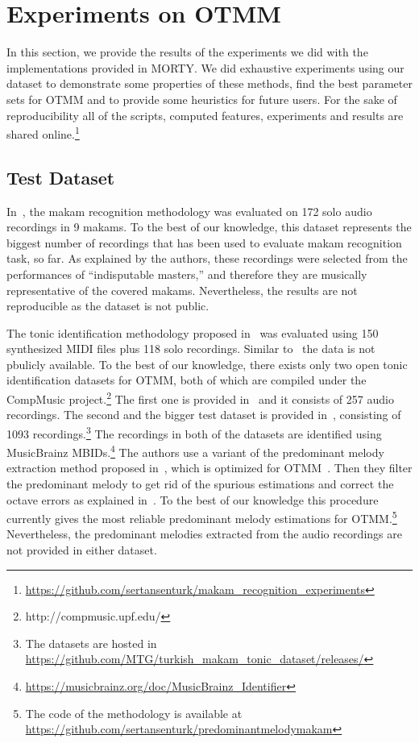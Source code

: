 \documentclass{sig-alternate}
\begin{document}
\section{Experiments on OTMM}\label{sec:experiments}
In this section, we provide the results of the experiments we did with the implementations provided in MORTY. We did exhaustive experiments using our dataset to demonstrate some properties of these methods, find the best parameter sets for OTMM and to provide some heuristics for future users. For the sake of reproducibility all of the scripts, computed features, experiments and results are shared online.\footnote{\url{https://github.com/sertansenturk/makam_recognition_experiments}}

\subsection{Test Dataset}\label{sec:dataset}

In~\cite{bozkurt_makam}, the makam recognition methodology was evaluated on 172 solo audio recordings in 9 makams. To the best of our knowledge, this dataset represents the biggest number of recordings that has been used to evaluate makam recognition task, so far. As explained by the authors, these recordings were selected from the performances of ``indisputable masters,'' and therefore they are musically representative of the covered makams. Nevertheless, the results are not reproducible as the dataset is not public. 

The tonic identification methodology proposed in~\cite{bozkurt_tonic} was evaluated using 150 synthesized MIDI files plus 118 solo recordings. Similar to~\cite{bozkurt_makam} the data is not pbulicly available. To the best of our knowledge, there exists only two open tonic identification datasets for OTMM, both of which are compiled under the CompMusic project.\footnote{http://compmusic.upf.edu/} The first one is provided in~\cite{senturk2013karar_ismir} and it consists of 257 audio recordings. The second and the bigger test dataset is provided in~\cite{sercan_tonic}, consisting of 1093 recordings.\footnote{The datasets are hosted in \url{https://github.com/MTG/turkish_makam_tonic_dataset/releases/}} The recordings in both of the datasets are identified using MusicBrainz MBIDs.\footnote{\url{https://musicbrainz.org/doc/MusicBrainz_Identifier}} The authors use a variant of the predominant me\-lody extraction method proposed in~\cite{salamon2012melody}, which is optimized for OTMM~\cite{atli2014makamFeature_atmm}. Then they filter the predominant melody to get rid of the spurious estimations and correct the octave errors as explained in~\cite{bozkurt_tonic}. To the best of our knowledge this procedure~\cite{atli2014makamFeature_atmm} currently gives the most reliable predominant melody estimations for OTMM.\footnote{The code of the methodology is available at \url{https://github.com/sertansenturk/predominantmelodymakam}} Nevertheless, the predominant melodies extracted from the audio recordings are not provided in either dataset.
 
\end{document}
